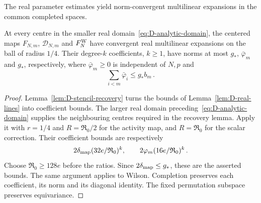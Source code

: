 The real parameter estimates yield norm-convergent multilinear expansions in the common completed spaces.
\begin{lemma}\label{lem:D-analytic-step}
At every centre in the smaller real domain~\eqref{eq:D-analytic-domain}, the centered maps $F_{N,m}$, $\mathcal D_{N,m}$ and $F_N^{\rm W}$ have convergent real multilinear expansions on the ball of radius $1/4$. Their degree-$k$ coefficients, $k\ge1$, have norms at most $g_*$, $\bar\varphi_m$ and $g_*$, respectively, where $\bar\varphi_m\ge0$ is independent of $N,p$ and
\begin{equation*}
\sum_{i<m}\bar\varphi_i\le g_*b_m\,.
\end{equation*}
\end{lemma}
\begin{proof}
Lemma~\ref{lem:D-stencil-recovery} turns the bounds of Lemma~\ref{lem:D-real-lines} into coefficient bounds. The larger real domain preceding~\eqref{eq:D-analytic-domain} supplies the neighbouring centres required in the recovery lemma. Apply it with $r=1/4$ and $R=\mathfrak R_0/2$ for the activity map, and $R=\mathfrak R_0$ for the scalar correction. Their coefficient bounds are respectively
\begin{equation*}
2\delta_{\rm map}(32e/\mathfrak R_0)^k,\qquad
2\varphi_m(16e/\mathfrak R_0)^k\,.
\end{equation*}
Choose $\mathfrak R_0\ge128e$ before the ratios. Since $2\delta_{\rm map}\le g_*$, these are the asserted bounds. The same argument applies to Wilson. Completion preserves each coefficient, its norm and its diagonal identity. The fixed permutation subspace preserves equivariance.
\end{proof}

